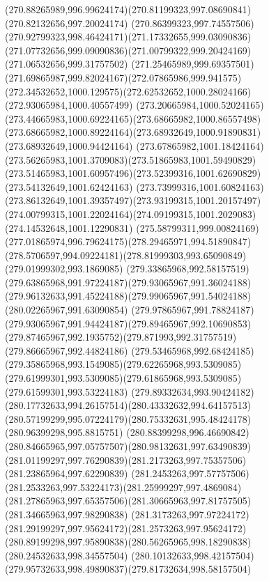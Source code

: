 {    \curveto(270.88265989,996.99624174)(270.81199323,997.08690841)(270.82132656,997.20024174)
    \curveto(270.86399323,997.74557506)(270.92799323,998.46424171)(271.17332655,999.03090836)
    \curveto(271.07732656,999.09090836)(271.00799322,999.20424169)(271.06532656,999.31757502)
    \curveto(271.25465989,999.69357501)(271.69865987,999.82024167)(272.07865986,999.941575)
    \curveto(272.34532652,1000.129575)(272.62532652,1000.28024166)(272.93065984,1000.40557499)
    \curveto(273.20665984,1000.52024165)(273.44665983,1000.69224165)(273.68665982,1000.86557498)
    \curveto(273.68665982,1000.89224164)(273.68932649,1000.91890831)(273.68932649,1000.94424164)
    \curveto(273.67865982,1001.18424164)(273.56265983,1001.3709083)(273.51865983,1001.59490829)
    \curveto(273.51465983,1001.60957496)(273.52399316,1001.62690829)(273.54132649,1001.62424163)
    \curveto(273.73999316,1001.60824163)(273.86132649,1001.39357497)(273.93199315,1001.20157497)
    \curveto(274.00799315,1001.22024164)(274.09199315,1001.2029083)(274.14532648,1001.12290831)
    \curveto(275.58799311,999.00824169)(277.01865974,996.79624175)(278.29465971,994.51890847)
    \curveto(278.5706597,994.09224181)(278.81999303,993.65090849)(279.01999302,993.1869085)
    \curveto(279.33865968,992.58157519)(279.63865968,991.97224187)(279.93065967,991.36024188)
    \curveto(279.96132633,991.45224188)(279.99065967,991.54024188)(280.02265967,991.63090854)
    \curveto(279.97865967,991.78824187)(279.93065967,991.94424187)(279.89465967,992.10690853)
    \curveto(279.87465967,992.1935752)(279.871993,992.31757519)(279.86665967,992.44824186)
    \curveto(279.53465968,992.68424185)(279.35865968,993.1549085)(279.62265968,993.5309085)
    \curveto(279.61999301,993.5309085)(279.61865968,993.5309085)(279.61599301,993.53224183)
    \curveto(279.89332634,993.90424182)(280.17732633,994.26157514)(280.43332632,994.64157513)
    \curveto(280.57199299,995.07224179)(280.75332631,995.48424178)(280.96399298,995.8815751)
    \curveto(280.88399298,996.46690842)(280.84665965,997.05757507)(280.98132631,997.63490839)
    \curveto(281.01199297,997.76290839)(281.2173263,997.75357506)(281.23865964,997.62290839)
    \curveto(281.2453263,997.57757506)(281.2533263,997.53224173)(281.25999297,997.4869084)
    \curveto(281.27865963,997.65357506)(281.30665963,997.81757505)(281.34665963,997.98290838)
    \curveto(281.3173263,997.97224172)(281.29199297,997.95624172)(281.2573263,997.95624172)
    \curveto(280.89199298,997.95890838)(280.56265965,998.18290838)(280.24532633,998.34557504)
    \curveto(280.10132633,998.42157504)(279.95732633,998.49890837)(279.81732634,998.58157504)
}
